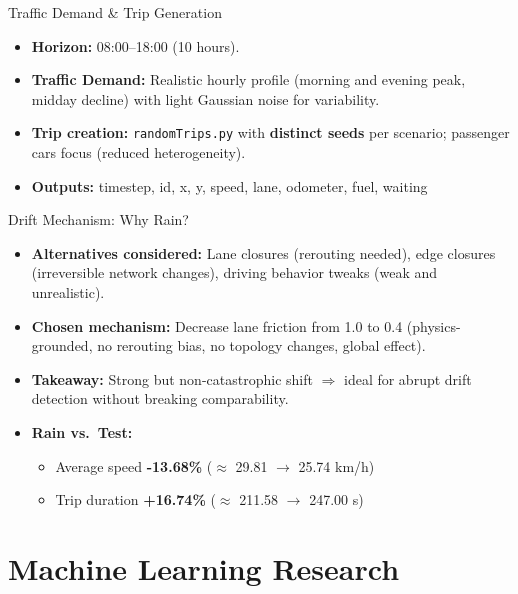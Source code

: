 \documentclass[aspectratio=169,11pt]{beamer}
\begin{document}
\begin{frame}{Traffic Demand \& Trip Generation}
    \begin{itemize}
        \item \textbf{Horizon:} {08:00--18:00} (10 hours).
            \medskip
        \item \textbf{Traffic Demand:} Realistic hourly profile (morning and evening peak, midday decline) with light Gaussian noise for variability.
            \medskip
        \item \textbf{Trip creation:} \texttt{randomTrips.py} with \textbf{distinct seeds} per scenario; passenger cars focus (reduced heterogeneity).
            \medskip
        \item \textbf{Outputs:} timestep, id, x, y, speed, lane, odometer, fuel, waiting
    \end{itemize}
\end{frame}

\begin{frame}{Drift Mechanism: Why Rain?}
    \begin{itemize}
        \item \textbf{Alternatives considered:} Lane closures (rerouting needed), edge closures (irreversible network changes), driving behavior tweaks (weak and unrealistic).
            \medskip
        \item \textbf{Chosen mechanism:} Decrease lane friction from 1.0 to 0.4 (physics-grounded, no rerouting bias, no topology changes, global effect).
            \medskip
        \item \textbf{Takeaway:} Strong but non-catastrophic shift $\Rightarrow$ ideal for abrupt drift detection without breaking comparability.
            \medskip
        \item \textbf{Rain vs.\ Test:}
            \medskip
            \begin{itemize}
                \item Average speed \textbf{-13.68\%} (\(\approx\) 29.81 $\to$ 25.74 km/h)
                    \medskip
                \item Trip duration \textbf{+16.74\%} (\(\approx\) 211.58 $\to$ 247.00 s)
            \end{itemize}
    \end{itemize}
\end{frame}

\section{Machine Learning Research}
\end{document}
